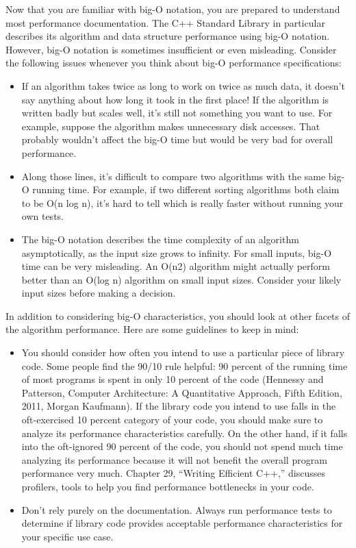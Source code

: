 
Now that you are familiar with big-O notation, you are prepared to understand most performance documentation. The C++ Standard Library in particular describes its algorithm and data structure performance using big-O notation. However, big-O notation is sometimes insufficient or even misleading. Consider the following issues whenever you think about big-O performance specifications:

\begin{itemize}
\item
If an algorithm takes twice as long to work on twice as much data, it doesn’t say anything about how long it took in the first place! If the algorithm is written badly but scales well, it’s still not something you want to use. For example, suppose the algorithm makes unnecessary disk accesses. That probably wouldn’t affect the big-O time but would be very bad for overall performance.

\item
Along those lines, it’s difficult to compare two algorithms with the same big-O running time. For example, if two different sorting algorithms both claim to be O(n log n), it’s hard to tell which is really faster without running your own tests.

\item
The big-O notation describes the time complexity of an algorithm asymptotically, as the input size grows to infinity. For small inputs, big-O time can be very misleading. An O(n2) algorithm might actually perform better than an O(log n) algorithm on small input sizes. Consider your likely input sizes before making a decision.
\end{itemize}

In addition to considering big-O characteristics, you should look at other facets of the algorithm performance. Here are some guidelines to keep in mind:

\begin{itemize}
\item
You should consider how often you intend to use a particular piece of library code. Some people find the 90/10 rule helpful: 90 percent of the running time of most programs is spent in only 10 percent of the code (Hennessy and Patterson, Computer Architecture: A Quantitative Approach, Fifth Edition, 2011, Morgan Kaufmann). If the library code you intend to use falls in the oft-exercised 10 percent category of your code, you should make sure to analyze its performance characteristics carefully. On the other hand, if it falls into the oft-ignored 90 percent of the code, you should not spend much time analyzing its performance because it will not benefit the overall program performance very much. Chapter 29, “Writing Efficient C++,” discusses profilers, tools to help you find performance bottlenecks in your code.

\item
Don’t rely purely on the documentation. Always run performance tests to determine if library code provides acceptable performance characteristics for your specific use case.
\end{itemize}

